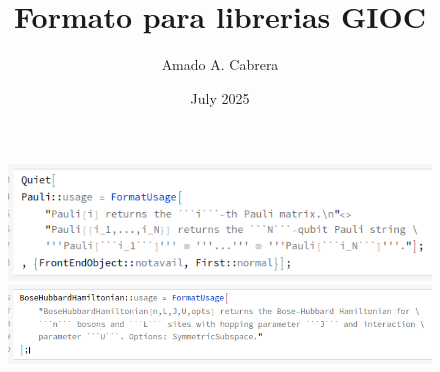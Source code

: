 \documentclass{article}
\title{Formato para librerias GIOC}
\author{Amado A. Cabrera}
\date{July 2025}
\begin{document}
\maketitle

\begin{figure}
\centering
\includegraphics[width=\textwidth]{estandar1.png}
\includegraphics[width=\textwidth]{estandar2.png}
\end{figure}
\end{document}
